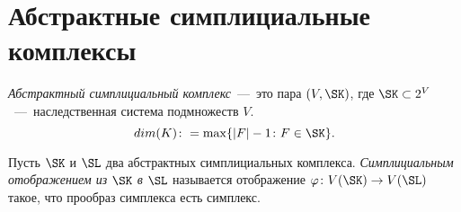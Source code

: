\section{Абстрактные симплициальные комплексы}

\begin{definition}
	\emph{Абстрактный симплициальный комплекс}~---~это пара $(V, \SK)$, где $\SK \subset 2^{V}$~---~наследственная система подмножеств $V$.
	$$dim(K) \colon = \max\lbrace |F| - 1 \colon F \in \SK \rbrace.$$
\end{definition}

\begin{definition}
	Пусть $\SK$ и $\SL$ два абстрактных симплициальных комплекса. \emph{Симплициальным отображением из $\SK$ в $\SL$} называется отображение $\varphi \colon V(\SK) \to V(\SL)$ такое, что прообраз симплекса есть симплекс.
\end{definition}